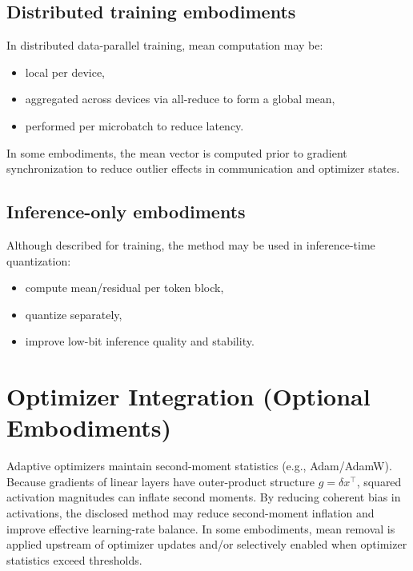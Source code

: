 \documentclass[11pt]{article}
\begin{document}
\subsection{Distributed training embodiments}
In distributed data-parallel training, mean computation may be:
\begin{itemize}[leftmargin=1.2em]
\item local per device,
\item aggregated across devices via all-reduce to form a global mean,
\item performed per microbatch to reduce latency.
\end{itemize}
In some embodiments, the mean vector is computed prior to gradient synchronization to reduce outlier effects in communication and optimizer states.

\subsection{Inference-only embodiments}
Although described for training, the method may be used in inference-time quantization:
\begin{itemize}[leftmargin=1.2em]
\item compute mean/residual per token block,
\item quantize separately,
\item improve low-bit inference quality and stability.
\end{itemize}

\section{Optimizer Integration (Optional Embodiments)}
Adaptive optimizers maintain second-moment statistics (e.g., Adam/AdamW). Because gradients of linear layers have outer-product structure $g=\delta x^\top$, squared activation magnitudes can inflate second moments. By reducing coherent bias in activations, the disclosed method may reduce second-moment inflation and improve effective learning-rate balance. In some embodiments, mean removal is applied upstream of optimizer updates and/or selectively enabled when optimizer statistics exceed thresholds.

\end{document}
